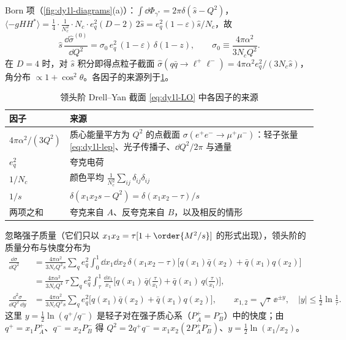 Born 项（\cref{fig:dy1l-diagrams}(a)）：$\int\dd\Phi_{\gamma^*}=2\pi\delta(\hat s-Q^2)$，
$\langle-gHH^*\rangle=\frac14\cdot\frac{1}{N_c^2}\cdot N_c\cdot e_q^2(D-2)\,2\hat s=e_q^2(1-\varepsilon)\hat s/N_c$，故
\begin{equation}\label{eq:dy1l-born}
\hat s\,\frac{\dd\hat\sigma^{(0)}}{\dd Q^2}=\sigma_0\,e_q^2\,(1-\varepsilon)\,\delta(1-z),\qquad
\sigma_0\equiv\frac{4\pi\alpha^2}{3N_cQ^2}.
\end{equation}
在 $D=4$ 时，对 $\hat s$ 积分即得点粒子截面 $\hat\sigma(q\bar q\to\ell^+\ell^-)=4\pi\alpha^2e_q^2/(3N_c\hat s)$，
角分布 $\propto1+\cos^2\theta$。各因子的来源列于\cref{tab:dy1l-factors}。

\begin{table}[htbp]
\centering
\caption{领头阶 Drell--Yan 截面 \cref{eq:dy1l-LO} 中各因子的来源}
\label{tab:dy1l-factors}
\begin{tabularx}{0.92\textwidth}{>{\raggedright\arraybackslash}p{2.6cm}X}
\toprule
因子 & 来源\\
\midrule
$4\pi\alpha^2/(3Q^2)$ & 质心能量平方为 $Q^2$ 的点截面 $\sigma(e^+e^-\to\mu^+\mu^-)$：轻子张量 \cref{eq:dy1l-lep}、光子传播子、$\dd Q^2/2\pi$ 与通量\\
$e_q^2$ & 夸克电荷\\
$1/N_c$ & 颜色平均 $\frac{1}{N_c^2}\sum_{ij}\delta_{ij}\delta_{ij}$\\
$1/s$ & $\delta(x_1x_2s-Q^2)=\delta(x_1x_2-\tau)/s$\\
两项之和 & 夸克来自 $A$、反夸克来自 $B$，以及相反的情形\\
\bottomrule
\end{tabularx}
\end{table}

\begin{proposition}\label{prop:dy1l-LO}
忽略强子质量（它们只以 $x_1x_2=\tau[1+\order{M^2/s}]$ 的形式出现），领头阶的质量分布与快度分布为
\begin{align}
\frac{\dd\sigma}{\dd Q^2}&=\frac{4\pi\alpha^2}{3N_cQ^2s}\sum_qe_q^2\int_0^1\!\dd x_1\dd x_2\,\delta(x_1x_2-\tau)
\big[q(x_1)\bar q(x_2)+\bar q(x_1)q(x_2)\big]\nonumber\\
&=\frac{4\pi\alpha^2}{3N_cQ^4}\,\tau\sum_qe_q^2\int_\tau^1\frac{\dd x_1}{x_1}\Big[q(x_1)\,\bar q\Big(\frac{\tau}{x_1}\Big)+\bar q(x_1)\,q\Big(\frac{\tau}{x_1}\Big)\Big],
\label{eq:dy1l-LO}\\
\frac{\dd^2\sigma}{\dd Q^2\,\dd y}&=\frac{4\pi\alpha^2}{3N_cQ^2s}\sum_qe_q^2\big[q(x_1)\bar q(x_2)+\bar q(x_1)q(x_2)\big],\qquad
x_{1,2}=\sqrt\tau\,\ee^{\pm y},\quad|y|\le\tfrac12\ln\tfrac1\tau .
\label{eq:dy1l-LOy}
\end{align}
这里 $y=\frac12\ln(q^+/q^-)$ 是轻子对在强子质心系（$P_A^+=P_B^-$）中的快度；由 $q^+=x_1P_A^+$、$q^-=x_2P_B^-$
得 $Q^2=2q^+q^-=x_1x_2(2P_A^+P_B^-)$、$y=\frac12\ln(x_1/x_2)$。
\end{proposition}

